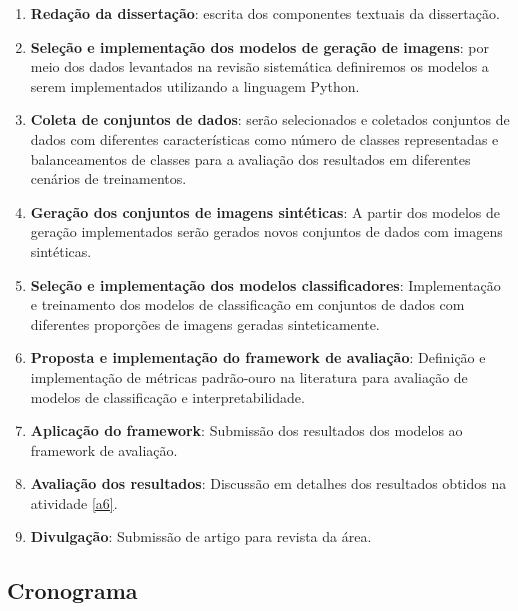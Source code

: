 \begin{enumerate}

    \item \label{a0} \textbf{Redação da dissertação}: escrita dos componentes textuais da dissertação.

    \item \label{a1} \textbf{Seleção e implementação dos modelos de geração de imagens}: por meio dos dados levantados na revisão sistemática definiremos os modelos a serem implementados utilizando a linguagem Python.
    
    \item \label{a2} \textbf{Coleta de conjuntos de dados}: serão selecionados e coletados conjuntos de dados com diferentes características como número de classes representadas e balanceamentos de classes para a avaliação dos resultados em diferentes cenários de treinamentos.
    
    \item \label{a3} \textbf{Geração dos conjuntos de imagens sintéticas}: A partir dos modelos de geração implementados serão gerados novos conjuntos de dados com imagens sintéticas.
    
    \item \label{a4} \textbf{Seleção e implementação dos modelos classificadores}: Implementação e treinamento dos modelos de classificação em conjuntos de dados com diferentes proporções de imagens geradas sinteticamente. 

    \item \label{a5} \textbf{Proposta e implementação do framework de avaliação}: Definição e implementação de métricas padrão-ouro na literatura para avaliação de modelos de classificação e interpretabilidade.
    
    \item \label{a6} \textbf{Aplicação do framework}: Submissão dos resultados dos modelos ao framework de avaliação.
    
    \item \label{a7} \textbf{Avaliação dos resultados}: Discussão em detalhes dos resultados obtidos na atividade \ref{a6}.
    
    \item \label{a8} \textbf{Divulgação}: Submissão de artigo para revista da área.
\end{enumerate}

\subsection{Cronograma}

